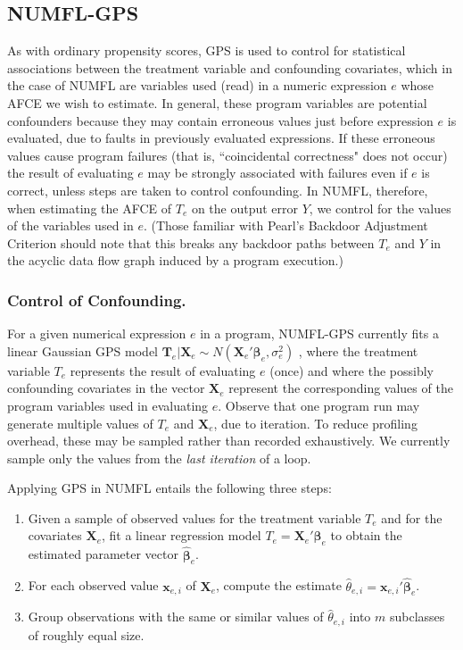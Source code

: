 \documentclass[times]{stvrauth}
\begin{document}
\subsection{NUMFL-GPS}\label{IVA}
As with ordinary propensity scores, GPS is used to control for statistical associations between the treatment variable and confounding covariates, which in the case of NUMFL are variables used (read) in a numeric expression $e$ whose AFCE we wish to estimate. In general, these program variables are potential confounders because they may contain erroneous values just before expression $e$ is evaluated, due to faults in previously evaluated expressions. If these erroneous values cause program failures (that is, ``coincidental correctness" does not occur) the result of evaluating $e$ may be strongly associated with failures even if $e$ is correct, unless steps are taken to control confounding. In NUMFL, therefore, when estimating the AFCE of $T_e$ on the output error $Y$, we control for the values of the variables used in $e$.  (Those familiar with Pearl's Backdoor Adjustment Criterion \cite{Pearl2003} should note that this breaks any backdoor paths between $T_e$ and $Y$ in the acyclic data flow graph induced by a program execution.)

\subsubsection{Control of Confounding.}
For a given numerical expression $e$ in a program, NUMFL-GPS currently fits a linear
Gaussian GPS model ${{\pmb T}_e}|{{\pmb X}_e} \sim N({\pmb X}_e'{{\pmb \beta} _e}, \sigma _e^2)$ , where the treatment variable $T_e$ represents the result of evaluating $e$ (once) and where the possibly confounding covariates in the vector $\pmb{X}_e$ represent the corresponding values of the program variables used in evaluating $e$. Observe that one program run may generate multiple values of $T_e$ and $\pmb{X}_e$, due to iteration. To reduce profiling overhead, these may be sampled rather than recorded exhaustively. We currently sample only the values from the {\it last iteration} of a loop.

Applying GPS in NUMFL entails the following three steps:
\begin{enumerate}
\item 	Given a sample of observed values for the treatment variable $T_e$ and for the covariates $\pmb{X}_e$, fit a linear regression model $T_e=\pmb{X}_e' \pmb{\beta}_e$ to obtain the estimated parameter vector $\hat {\pmb{\beta}}_e$.
\item For each observed value ${\pmb x}_{e,i}$ of $\pmb{X}_e$, compute the estimate ${{\hat \theta }_{e,i}} = {\pmb{x}_{e,i}}'{{\hat {\pmb{\beta}} }_e}$.
\item Group observations with the same or similar values of $\hat{\theta}_{e,i}$ into $m$ subclasses of roughly equal size.
\end{enumerate}
\end{document}
